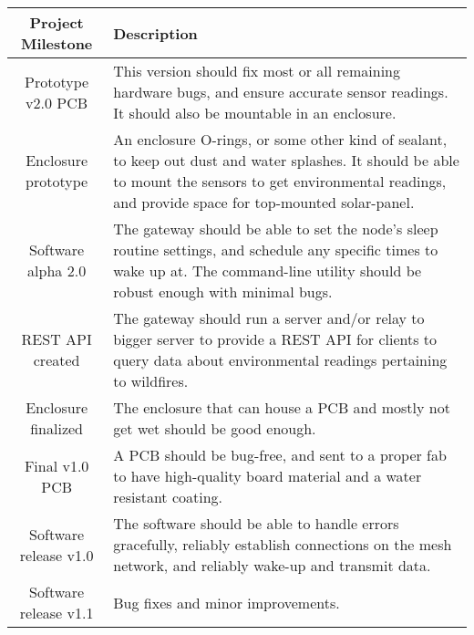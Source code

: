%
%
\begin{table}[H]    
    \centering
    \begin{tabularx}{\linewidth}{|c|X|}
        \hline
        Project Milestone & Description 
        \\
        \hline\hline
        Prototype v2.0 PCB 
        & This version should fix most or all remaining hardware bugs, and ensure accurate sensor readings. It should also be mountable in an enclosure.
        \\
        
        \hline
        Enclosure prototype
        & An enclosure O-rings, or some other kind of sealant, to keep out dust and water splashes. It should be able to mount the sensors to get environmental readings, and provide space for top-mounted solar-panel.
        \\
        
        \hline
        Software alpha 2.0 
        & The gateway should be able to set the node's sleep routine settings, and schedule any specific times to wake up at. The command-line utility should be robust enough with minimal bugs.
        \\
        
        \hline
        REST API created
        & The gateway should run a server and/or relay to bigger server to provide a REST API for clients to query data about environmental readings pertaining to wildfires.
        \\
        
        \hline
        Enclosure finalized
        & The enclosure that can house a PCB and mostly not get wet should be good enough.
        \\
        
        \hline
        Final v1.0 PCB
        & A PCB should be bug-free, and sent to a proper fab to have high-quality board material and a water resistant coating.
        \\
        
        \hline
        Software release v1.0
        & The software should be able to handle errors gracefully, reliably establish connections on the mesh network, and reliably wake-up and transmit data.
        \\ 
        
        \hline
        Software release v1.1
        & Bug fixes and minor improvements.
        \\ 
        

\end{tabularx}
\end{table}
